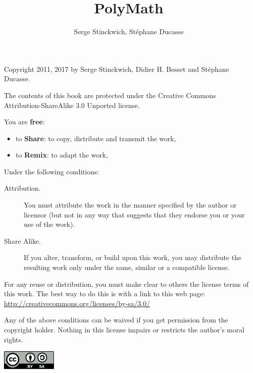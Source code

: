 \documentclass[english,twoside,openany,showtrims]{sbabook}
\title{PolyMath}
\author{Serge Stinckwich, Stéphane Ducasse}
\date{\gitdate\titlebreak[\smallskip]{ -- }\protect\gitCommitInfo}
\begin{document}
\maketitle
\pagestyle{titlingpage}
\thispagestyle{titlingpage} %

\cleartoverso
{\small

  Copyright 2011, 2017 by Serge Stinckwich, Didier H. Besset and Stéphane Ducasse.

  The contents of this book are protected under the Creative Commons
  Attribution-ShareAlike 3.0 Unported license.

  You are \textbf{free}:
  \begin{itemize}
  \item to \textbf{Share}: to copy, distribute and transmit the work,
  \item to \textbf{Remix}: to adapt the work,
  \end{itemize}

  Under the following conditions:
  \begin{description}
  \item[Attribution.] You must attribute the work in the manner specified by the
    author or licensor (but not in any way that suggests that they endorse you
    or your use of the work).
  \item[Share Alike.] If you alter, transform, or build upon this work, you may
    distribute the resulting work only under the same, similar or a compatible
    license.
  \end{description}

  For any reuse or distribution, you must make clear to others the
  license terms of this work. The best way to do this is with a link to
  this web page: \\
  \url{http://creativecommons.org/licenses/by-sa/3.0/}

  Any of the above conditions can be waived if you get permission from
  the copyright holder. Nothing in this license impairs or restricts the
  author's moral rights.

  \begin{center}
    \includegraphics[width=0.2\textwidth]{CreativeCommons-BY-SA.pdf}
  \end{center}

}
\end{document}
